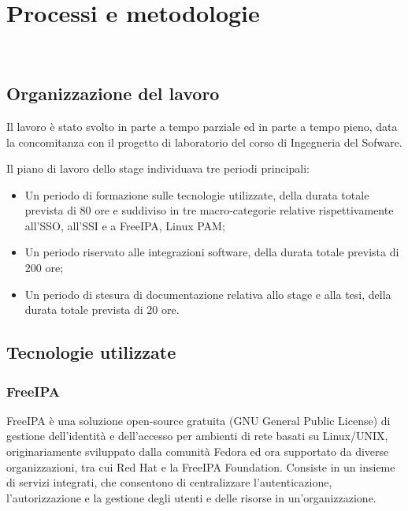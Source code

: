 
\chapter{Processi e metodologie}
\label{cap:processi-metodologie}

\\

\section{Organizzazione del lavoro}

Il lavoro è stato svolto in parte a tempo parziale ed in parte a tempo pieno, data la concomitanza con il progetto di laboratorio del corso di Ingegneria del Sofware. 

Il piano di lavoro dello stage individuava tre periodi principali:

\begin{itemize}
    \item Un periodo di formazione sulle tecnologie utilizzate, della durata totale prevista di 80 ore e suddiviso in tre macro-categorie relative rispettivamente all'SSO, all'SSI e a FreeIPA, Linux PAM;
    \item Un periodo riservato alle integrazioni software, della durata totale prevista di 200 ore;
    \item Un periodo di stesura di documentazione relativa allo stage e alla tesi, della durata totale prevista di 20 ore.
\end{itemize}




\section{Tecnologie utilizzate}
\subsection{FreeIPA}
FreeIPA è una soluzione open-source gratuita (GNU General Public License) di gestione dell'identità e dell'accesso per ambienti di rete basati su Linux/UNIX, originariamente sviluppato dalla comunità Fedora ed ora supportato da diverse organizzazioni, tra cui Red Hat e la FreeIPA Foundation. Consiste in un insieme di servizi integrati, che consentono di centralizzare l'autenticazione, l'autorizzazione e la gestione degli utenti e delle risorse in un'organizzazione.


